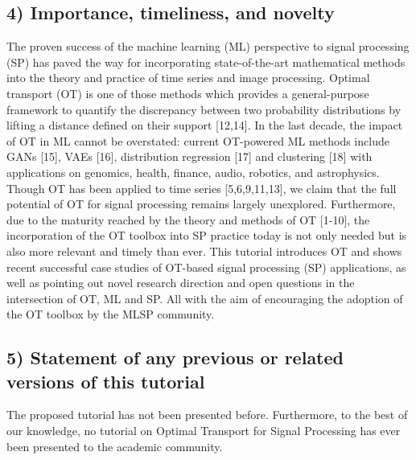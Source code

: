 \documentclass{article}
\begin{document}
\subsection*{4) Importance, timeliness, and novelty}

The proven success of the machine learning (ML) perspective to signal processing (SP) has paved the way for incorporating state-of-the-art mathematical methods into the theory and practice of time series and image processing. Optimal transport (OT) is one of those methods which provides a general-purpose framework to quantify the discrepancy between two probability distributions by lifting a distance defined on their support [12,14]. In the last decade, the impact of OT in ML cannot be overstated: current OT-powered ML methods include GANs [15], VAEs [16], distribution regression [17] and clustering [18] with applications on genomics, health, finance, audio, robotics, and astrophysics. \\

\noindent Though OT has been applied to time series [5,6,9,11,13], we claim that the full potential of OT for signal processing remains largely unexplored. Furthermore, due to the maturity reached by the theory and methods of OT [1-10], the incorporation of the OT toolbox into SP practice today is not only needed but is also more relevant and timely than ever. This tutorial introduces OT and shows recent successful case studies of OT-based signal processing (SP) applications, as well as pointing out novel research direction and open questions in the intersection of OT, ML and SP. All with the aim of encouraging the adoption of the OT toolbox by the MLSP community. 





\subsection*{5) Statement of any previous or related versions of this tutorial}

The proposed tutorial has not been presented before. Furthermore, to the best of our knowledge, no tutorial on Optimal Transport for Signal Processing has ever been presented to the academic community. \\
\end{document}
